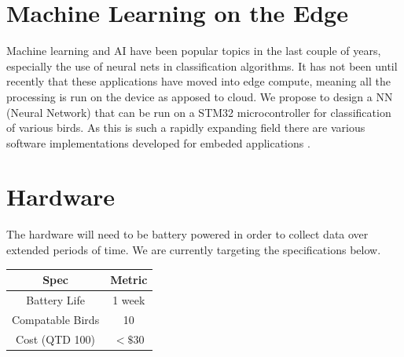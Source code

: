\documentclass[12pt,journal,compsoc]{IEEEtran}
\begin{document}
\section{Machine Learning on the Edge}

Machine learning and AI have been popular topics in the last couple of years, especially the use of neural nets in classification algorithms. It has not been until recently that these applications have moved into edge compute, meaning all the processing is run on the device as apposed to cloud. We propose to design a NN (Neural Network) that can be run on a STM32 microcontroller for classification of various birds. As this is such a rapidly expanding field there are various software implementations developed for embeded applications \cite{CMSIS} \cite{TF}. 

\section{Hardware}
The hardware will need to be battery powered in order to collect data over extended periods of time. We are currently targeting the specifications below.

\begin{center}
\begin{tabular}{ c | c }
Spec             & Metric\\ 
\hline 
Battery Life     & 1 week\\
Compatable Birds & 10    \\
Cost (QTD 100)   & $<\$30$  \\
\end{tabular}
\end{center}
\end{document}
